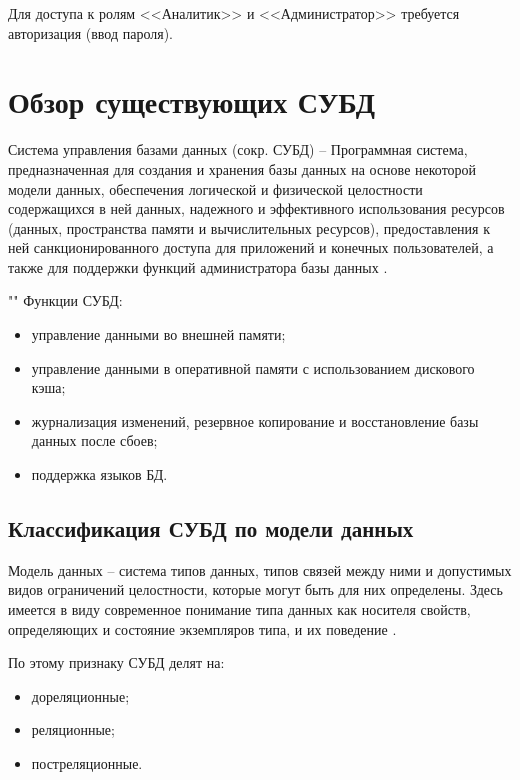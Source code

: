 \documentclass[a4paper,14pt]{extreport}
\begin{document}
\captionsetup{singlelinecheck = false, justification=centering}

Для доступа к ролям <<Аналитик>> и <<Администратор>> требуется авторизация (ввод пароля).

\section{Обзор существующих СУБД}

Система управления базами данных (сокр. СУБД) -- Программная система, предназначенная для создания и хранения базы данных на основе некоторой модели данных, обеспечения логической и физической целостности содержащихся в ней данных, надежного и эффективного использования ресурсов (данных, пространства памяти и вычислительных ресурсов), предоставления к ней санкционированного доступа для приложений и конечных пользователей, а также для поддержки 
функций администратора базы данных \cite{kogal}.

""\newline
Функции СУБД:

\begin{itemize}
	\setlength\itemsep{0.01em}
	\item управление данными во внешней памяти;
	\item управление данными в оперативной памяти с использованием дискового кэша;
	\item журнализация изменений, резервное копирование и восстановление базы данных после сбоев;
	\item поддержка языков БД.
\end{itemize}

\subsection{Классификация СУБД по модели данных}

Модель данных --  система типов данных, типов связей между ними и допустимых видов ограничений целостности, которые могут быть для них определены. Здесь имеется в виду современное понимание типа данных как носителя свойств, определяющих и состояние экземпляров типа, и их поведение \cite{kogal}.

По этому признаку СУБД делят на:

\begin{itemize}
	\setlength\itemsep{0.01em}
	\item дореляционные;
	\item реляционные;
	\item постреляционные.
\end{itemize}
\end{document}
